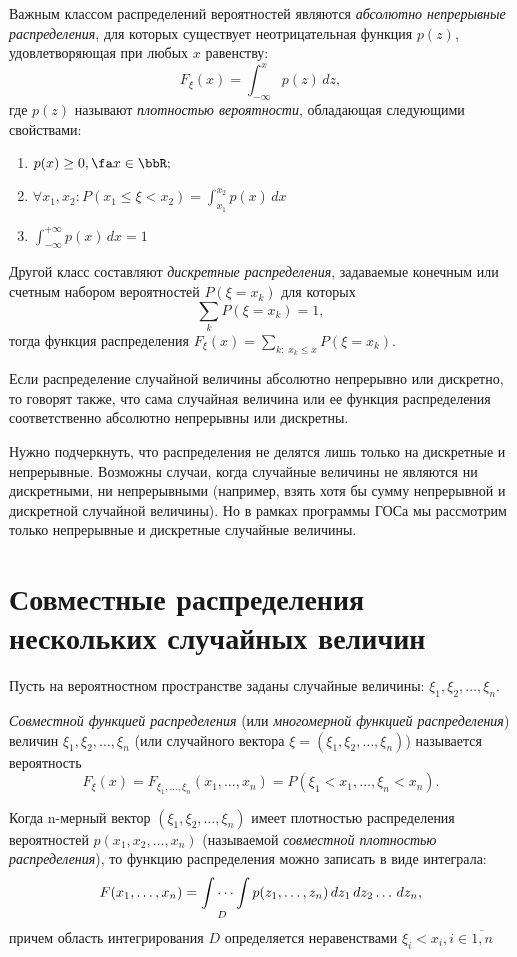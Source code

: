 Важным классом распределений вероятностей являются \textit{абсолютно непрерывные распределения}, для которых существует неотрицательная функция $p(z)$, удовлетворяющая при любых $x$ равенству:
$$F_\xi(x)=\int_{-\infty}^{x}p(z)\,dz,$$ где $p(z)$ называют \textit{плотностью вероятности}, обладающая следующими свойствами:
\begin{enumerate}
\item 
$p(x)\ge 0, \fa x \in \bbR;$ 
\item 
$\forall x_1,x_2: P(x_1\le\xi<x_2)=\int_{x_1}^{x_2}p(x)\,dx$
\item
$\int_{-\infty}^{+\infty}p(x)\,dx=1$
\end{enumerate}

Другой класс составляют \textit{дискретные распределения}, задаваемые конечным или счетным набором вероятностей $P(\xi = x_k)$ для которых
$$
\sum\limits_k P(\xi=x_k)=1,
$$
тогда функция распределения $F_\xi(x)=\sum\limits_{k:\; x_k \le x} P(\xi=x_k)$.

Если распределение случайной величины абсолютно непрерывно или дискретно, то говорят также, что сама случайная величина или ее функция распределения соответственно абсолютно непрерывны или дискретны.

Нужно подчеркнуть, что распределения не делятся лишь только на дискретные и непрерывные. Возможны случаи, когда случайные величины не являются ни дискретными, ни непрерывными (например, взять хотя бы сумму непрерывной и дискретной случайной величины). Но в рамках программы ГОСа мы рассмотрим только непрерывные и дискретные случайные величины. 

\section{Совместные распределения нескольких случайных величин}
Пусть на вероятностном пространстве заданы случайные величины: $\xi_1,\xi_2,\dots,\xi_n$.
\begin{defn}
\textit{Совместной функцией распределения} (или\textit{ многомерной функцией распределения}) величин $\xi_1,\xi_2,\dots,\xi_n$ (или случайного вектора $\xi = (\xi_1,\xi_2,\dots,\xi_n)$) называется вероятность 
$$
F_\xi(x)=F_{\xi_1,\dots,\xi_n}(x_1,\dots,x_n)=P(\xi_1 < x_1,\dots,\xi_n<x_n).
$$
\end{defn}

Когда n-мерный вектор $(\xi_1,\xi_2,\dots,\xi_n)$ имеет плотностью распределения вероятностей $p(x_1,x_2,\dots,x_n)$ (называемой \textit{совместной плотностью распределения}), то функцию распределения можно записать в виде интеграла:
$$
F(x_1,\dots,x_n)=\idotsint\limits_D p(z_1,\dots,z_n)\,dz_1\,dz_2\dots\,dz_n,
$$
причем область интегрирования $D$ определяется неравенствами $\xi_i<x_i, i\in \overline{1,n}$

